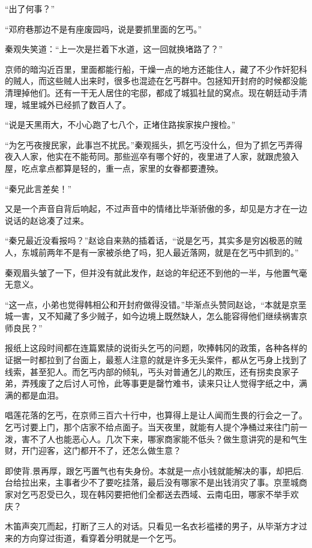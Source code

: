 “出了何事？”

“邓府巷那边不是有座废园吗，说是要抓里面的乞丐。”

秦观失笑道：“上一次是拦着下水道，这一回就换堵路了？”

京师的暗沟近百里，里面都能行船，干燥一点的地方还能住人，藏了不少作奸犯科的贼人，而这些贼人出来时，很多也混迹在乞丐群中。包拯知开封府的时候都没能清理掉他们。还有一干无人居住的宅邸，都成了城狐社鼠的窝点。现在朝廷动手清理，城里城外已经抓了数百人了。

“说是天黑雨大，不小心跑了七八个，正堵住路挨家挨户搜检。”

“为乞丐夜搜民家，此事岂不扰民。”秦观摇头，抓乞丐没什么，但为了抓乞丐弄得夜入人家，他实在不能苟同。那些巡卒有哪个好的，夜里进了人家，就跟虎狼入屋，吃点拿点都算是轻的，重一点，家里的女眷都要遭殃。

“秦兄此言差矣！”

又是一个声音自背后响起，不过声音中的情绪比毕渐骄傲的多，却见是方才在一边说话的赵谂凑了过来。

“秦兄最近没看报吗？”赵谂自来熟的插着话，“说是乞丐，其实多是穷凶极恶的贼人，东城前两年不是有一家被杀绝了吗，犯人最近落网，就是在乞丐中抓到的。”

秦观眉头皱了一下，但并没有就此发作，赵谂的年纪还不到他的一半，与他置气毫无意义。

“这一点，小弟也觉得韩相公和开封府做得没错。”毕渐点头赞同赵谂，“本就是京垩城一害，又不知藏了多少贼子，如今边境上既然缺人，怎么能容得他们继续祸害京师良民？”

报纸上这段时间都在连篇累牍的说街头乞丐的问题，吹捧韩冈的政策，各种各样的证据一时都拉到了台面上，最惹人注意的就是许多无头案件，都从乞丐身上找到了线索，甚至犯人。而乞丐内部的倾轧，丐头对普通乞儿的欺压，还有拐卖良家子弟，弄残废了之后讨人可怜，此等事更是罄竹难书，读来只让人觉得字纸之中，满满的都是血泪。

唱莲花落的乞丐，在京师三百六十行中，也算得上是让人闻而生畏的行会之一了。乞丐讨要上门，那个店家不给点面子。当天夜里，就能有人提个净桶过来往门前一泼，害不了人也能恶心人。几次下来，哪家商家能不低头？做生意讲究的是和气生财，开门迎客，这门都开不了，还怎么做生意？

即使背.景再厚，跟乞丐置气也有失身份。本就是一点小钱就能解决的事，却把后.台给拉出来，主事者少不了要吃挂落，最后没有哪家不是出钱消灾了事。京垩城商家对乞丐忍受已久，现在韩冈要把他们全都送去西域、云南屯田，哪家不举手欢庆？

木笛声突兀而起，打断了三人的对话。只看见一名衣衫褴褛的男子，从毕渐方才过来的方向穿过街道，看穿着分明就是一个乞丐。

